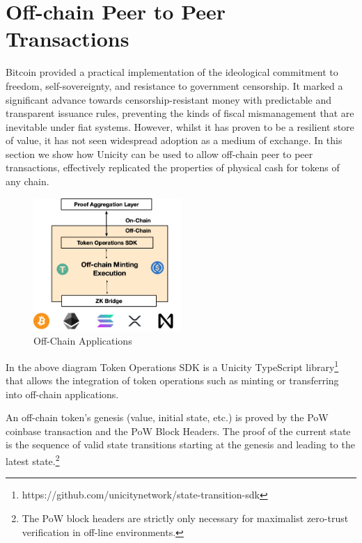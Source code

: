 \documentclass{article}
\begin{document}
\section{Off-chain Peer to Peer Transactions}

Bitcoin provided a practical implementation of the ideological commitment to freedom, self-sovereignty, and resistance to government censorship.  It marked a significant advance towards censorship-resistant money with predictable and transparent issuance rules, preventing the kinds of fiscal mismanagement that are inevitable under fiat systems. However, whilst it has proven to be a resilient store of value, it has not seen widespread adoption as a medium of exchange. In this section we show how Unicity can be used to allow off-chain peer to peer transactions, effectively replicated the properties of physical cash for tokens of any chain.

\begin{figure}[htbp]
    \centering
    \vspace{2\baselineskip}
    \includegraphics[width=0.5\textwidth]{Unicity_Offchain.png}
    \caption{Off-Chain Applications}
    \label{fig:GenesisEvent}
\end{figure}

In the above diagram Token Operations SDK is a Unicity TypeScript library\footnote{https://github.com/unicitynetwork/state-transition-sdk} that allows the integration of token operations such as minting or transferring into off-chain applications.




An off-chain token's genesis (value, initial state, etc.) is proved by the PoW coinbase transaction and the PoW Block Headers. The proof of the current state is the sequence of valid state transitions starting at the genesis and leading to the latest state.\footnote{The PoW block headers are strictly only necessary for maximalist zero-trust verification in off-line environments.}
\end{document}
